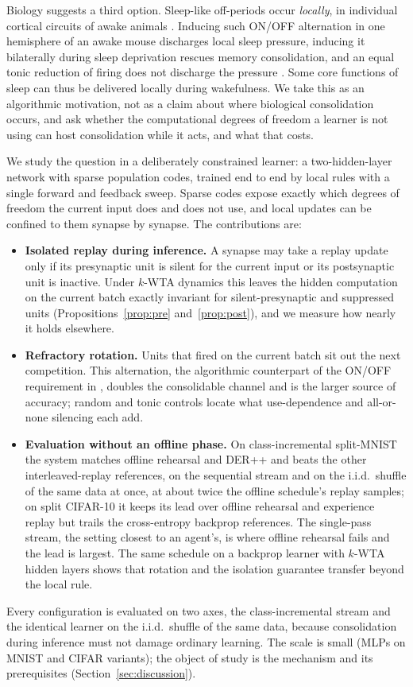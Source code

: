 \documentclass{article}
\newcommand{\kwta}{$k$-WTA}
\begin{document}
Biology suggests a third option. Sleep-like off-periods occur \emph{locally}, in individual
cortical circuits of awake animals \citep{vyazovskiy2011}. Inducing such ON/OFF alternation in
one hemisphere of an awake mouse discharges local sleep pressure, inducing it bilaterally during
sleep deprivation rescues memory consolidation, and an equal tonic reduction of firing does not
discharge the pressure \citep{driessen2026}. Some core functions of sleep can thus be delivered
locally during wakefulness. We take this as an algorithmic motivation, not as a claim about
where biological consolidation occurs, and ask whether the computational degrees of freedom a
learner is not using can host consolidation while it acts, and what that costs.

We study the question in a deliberately constrained learner: a two-hidden-layer network with
sparse population codes, trained end to end by local rules with a single forward and feedback
sweep. Sparse codes expose exactly which degrees of freedom the current input does and does
not use, and local updates can be confined to them synapse by synapse. The contributions are:
\begin{itemize}[leftmargin=1.2em, itemsep=1pt, topsep=2pt]
\item \textbf{Isolated replay during inference.} A synapse may take a replay update only if
its presynaptic unit is silent for the current input or its postsynaptic unit is inactive.
Under \kwta{} dynamics this leaves the hidden computation on the current batch exactly
invariant for silent-presynaptic and suppressed units (Propositions~\ref{prop:pre}
and~\ref{prop:post}), and we measure how nearly it holds elsewhere.
\item \textbf{Refractory rotation.} Units that fired on the current batch sit out the next
competition. This alternation, the algorithmic counterpart of the ON/OFF requirement in
\citet{driessen2026}, doubles the consolidable channel and is the larger source of accuracy;
random and tonic controls locate what use-dependence and all-or-none silencing each add.
\item \textbf{Evaluation without an offline phase.} On class-incremental split-MNIST the
system matches offline rehearsal and DER++ and beats the other interleaved-replay references,
on the sequential stream and on the i.i.d.\ shuffle of the same data at once, at about twice
the offline schedule's replay samples; on split CIFAR-10 it keeps its lead over offline
rehearsal and experience replay but trails the cross-entropy backprop references. The
single-pass stream, the setting closest to an agent's, is where offline rehearsal fails and
the lead is largest. The same schedule on a backprop learner with \kwta{} hidden layers
shows that rotation and the isolation guarantee transfer beyond the local rule.
\end{itemize}
Every configuration is evaluated on two axes, the class-incremental stream and the identical
learner on the i.i.d.\ shuffle of the same data, because consolidation during inference must
not damage ordinary learning. The scale is small (MLPs on MNIST and CIFAR variants); the
object of study is the mechanism and its prerequisites (Section~\ref{sec:discussion}).
\end{document}
